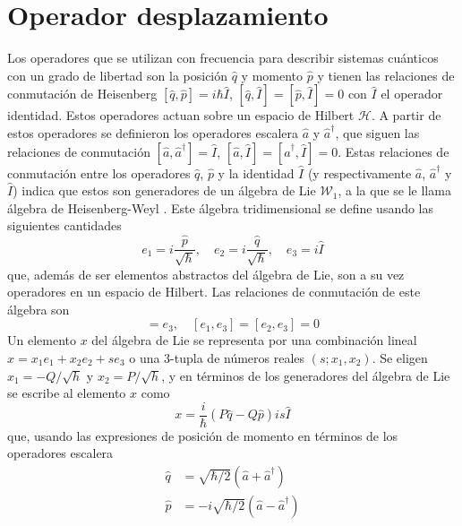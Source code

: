 \section{Operador desplazamiento}
Los operadores que se utilizan con frecuencia para describir sistemas cuánticos con un grado de libertad son la posición $\hat{q}$ y momento $\hat{p}$ y tienen las relaciones de conmutación de Heisenberg $[\hat{q}, \hat{p}] = i\hbar \hat{I}$, $[\hat{q}, \hat{I}] = [\hat{p}, \hat{I}]=0$ con $\hat{I}$ el operador identidad. Estos operadores actuan sobre un espacio de Hilbert $\mathcal{H}$. A partir de estos operadores se definieron los operadores escalera $\hat{a}$ y $\hat{a}^{\dagger}$, que siguen las relaciones de conmutación $[\hat{a}, \hat{a}^{\dagger}] = \hat{I}$, $[\hat{a}, \hat{I}]=[\hat{a}^{\dagger}, \hat{I}] = 0$. Estas relaciones de conmutación entre los operadores $\hat{q}$, $\hat{p}$ y la identidad $\hat{I}$ (y respectivamente $\hat{a}$, $\hat{a}^{\dagger}$ y $\hat{I}$) indica que estos son generadores de un álgebra de Lie $\mathcal{W}_1$, a la que se le llama álgebra de Heisenberg-Weyl \cite{Perelomov}. Este álgebra tridimensional se define usando las siguientes cantidades
\begin{equation*}
  e_1 = i\frac{\hat{p}}{\sqrt{\hbar}}, \quad e_2 = i\frac{\hat{q}}{\sqrt{\hbar}}, \quad e_3 = i\hat{I}
\end{equation*}
que, además de ser elementos abstractos del álgebra de Lie, son a su vez operadores en un espacio de Hilbert. Las relaciones de conmutación de este álgebra son
\begin{equation*}
  [e_1, e_2] = e_3, \quad [e_1, e_3] = [e_2, e_3] = 0
\end{equation*}
Un elemento $x$ del álgebra de Lie se representa por una combinación lineal $x = x_1e_1 + x_2e_2 + s e_3$ o una 3-tupla de números reales $(s;x_1,x_2)$. Se eligen $x_1 = -Q/\sqrt{h}$ y $x_2 = P/\sqrt{h}$, y en términos de los generadores del álgebra de Lie se escribe al elemento $x$ como
\begin{equation}\label{eq:C3_combinacion_lineal}
  x = \frac{i}{\hbar}(P\hat{q} - Q\hat{p}) is\hat{I}
\end{equation}
que, usando las expresiones de posición de momento en términos de los operadores escalera
\begin{align}
  \hat{q} & = \sqrt{\hbar/2}(\hat{a} + \hat{a}^{\dagger}) \label{eq:C3_op_posicion_esc}  \\
  \hat{p} & = -i\sqrt{\hbar/2}(\hat{a} - \hat{a}^{\dagger}) \label{eq:C3_op_momento_esc}
\end{align}
